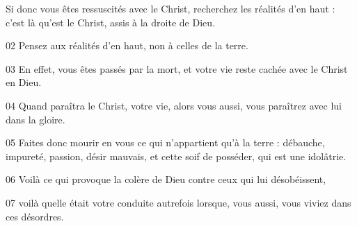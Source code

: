 Si donc vous êtes ressuscités avec le Christ, recherchez les réalités d’en haut : c’est là qu’est le Christ, assis à la droite de Dieu.

02 Pensez aux réalités d’en haut, non à celles de la terre.

03 En effet, vous êtes passés par la mort, et votre vie reste cachée avec le Christ en Dieu.

04 Quand paraîtra le Christ, votre vie, alors vous aussi, vous paraîtrez avec lui dans la gloire.

05 Faites donc mourir en vous ce qui n’appartient qu’à la terre : débauche, impureté, passion, désir mauvais, et cette soif de posséder, qui est une idolâtrie.

06 Voilà ce qui provoque la colère de Dieu contre ceux qui lui désobéissent,

07 voilà quelle était votre conduite autrefois lorsque, vous aussi, vous viviez dans ces désordres.